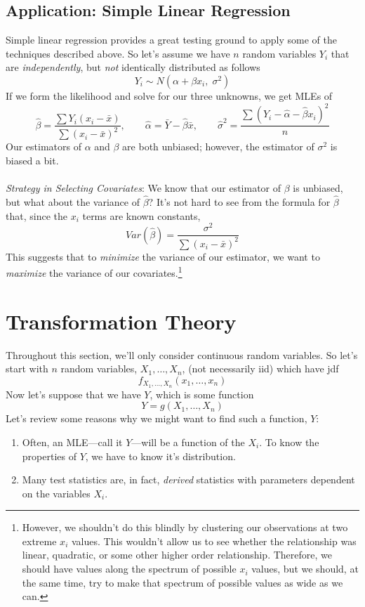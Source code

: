 \documentclass[a4paper,12pt]{scrartcl}
\begin{document}
\newpage
\subsection{Application: Simple Linear Regression}

Simple linear regression provides a great testing ground to apply
some of the techniques described above. So let's assume we have $n$
random variables $Y_i$ that are \emph{independently}, but
\emph{not} identically distributed as follows
   \[ Y_i \sim N(\alpha + \beta x_i,\; \sigma^2) \]
If we form the likelihood and solve for our three unknowns, we get
MLEs of
\[ \hat{\beta} = \frac{\sum Y_i (x_i - \bar{x})}{\sum (x_i-\bar{x})^2},
   \qquad \hat{\alpha}=\bar{Y} - \hat{\beta} \bar{x}, \qquad
   \hat{\sigma}^2 = \frac{\sum (Y_i - \hat{\alpha}-\hat{\beta}x_i)^2}{
   n}
   \]
Our estimators of $\alpha$ and $\beta$ are both unbiased; however,
the estimator of $\sigma^2$ is biased a bit.
\\
\\
{\sl Strategy in Selecting Covariates}: We know that our estimator
of $\beta$ is unbiased, but what about the variance of $\hat{\beta}$?
It's not hard to see from the formula for $\hat{\beta}$ that, since
the $x_i$ terms are known constants,
   \[ Var(\hat{\beta}) = \frac{\sigma^2}{\sum (x_i - \bar{x})^2} \]
This suggests that to \emph{minimize} the variance of our estimator, we
want to \emph{maximize} the variance of our covariates.\footnote{
However, we shouldn't do this blindly by clustering our observations
at two extreme $x_i$ values. This wouldn't allow us to see
whether the relationship was linear, quadratic, or some other higher
order relationship. Therefore, we should have values along the
spectrum of possible $x_i$ values, but we should, at the same time,
try to make that spectrum of possible values as wide as we can.}



\newpage
\section{Transformation Theory}

Throughout this section, we'll only consider continuous random
variables. So let's start with $n$ random variables, $X_1, \ldots,
X_n$, (not necessarily iid) which have jdf
   \[ f_{X_1, \ldots, X_n}(x_1, \ldots, x_n) \]
Now let's suppose that we have $Y$, which is some function
   \[ Y = g(X_1, \ldots, X_n) \]
Let's review some reasons why we might want to find such a function,
$Y$:
\begin{enumerate}
   \item Often, an MLE---call it $Y$---will be a function of the
      $X_i$. To know the properties of $Y$, we have to know it's
      distribution.
   \item Many test statistics are, in fact, \emph{derived} statistics
      with parameters dependent on the variables $X_i$.
\end{enumerate}
\end{document}
